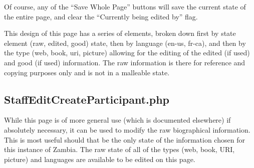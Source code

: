 \documentclass[tablesignature]{scrartcl}
\begin{document}
   Of course, any of the ``Save Whole Page'' buttons will save the
   current state of the entire page, and clear the ``Currently being
   edited by'' flag.

   This design of this page has a series of elements, broken down
   first by state element (raw, edited, good) state, then by language
   (en-us, fr-ca), and then by the type (web, book, uri, picture)
   allowing for the editing of the edited (if used) and good (if used)
   information.  The raw information is there for reference and
   copying purposes only and is not in a malleable state.
\subsection{StaffEditCreateParticipant.php}
\label{sec-3_3}

\label{StaffEditCreateParticipant.php}

   While this page is of more general use (which is documented
   elsewhere) if absolutely necessary, it can be used to modify the
   raw biographical information. This is most useful should that be
   the only state of the information chosen for this instance of
   Zambia.  The raw state of all of the types (web, book, URI,
   picture) and languages are available to be edited on this page.
\end{document}
